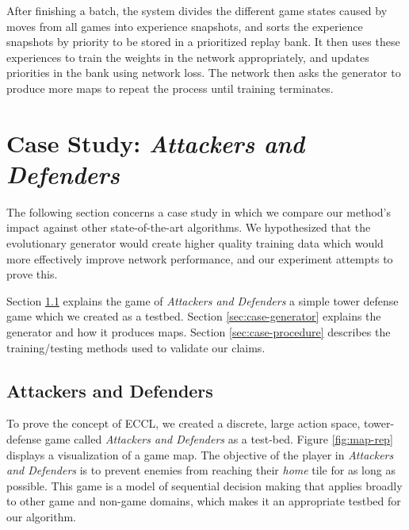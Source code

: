 \documentclass[letterpaper]{article} %
\begin{document}

After finishing a batch, the system divides the different game states caused by moves from all games into experience snapshots, and sorts the experience snapshots by priority to be stored in a prioritized replay bank. It then uses these experiences to train the weights in the network appropriately, and updates priorities in the bank using network loss. The network then asks the generator to produce more maps to repeat the process until training terminates.


\section{Case Study: \textit{Attackers and Defenders}}\label{sec:case}
The following section concerns a case study in which we compare our method's impact against other state-of-the-art algorithms. We hypothesized that the evolutionary generator would create higher quality training data which would more effectively improve network performance, and our experiment attempts to prove this.

Section \ref{sec:case-game} explains the game of \textit{Attackers and Defenders} a simple tower defense game which we created as a testbed. Section \ref{sec:case-generator} explains the generator and how it produces maps. Section \ref{sec:case-procedure} describes the training/testing methods used to validate our claims.

\subsection{Attackers and Defenders}\label{sec:case-game}
To prove the concept of ECCL, we created a discrete, large action space, tower-defense game called \textit{Attackers and Defenders} as a test-bed. Figure \ref{fig:map-rep} displays a visualization of a game map. The objective of the player in \textit{Attackers and Defenders} is to prevent enemies from reaching their \textit{home} tile for as long as possible. This game is a model of sequential decision making that applies broadly to other game and non-game domains, which makes it an appropriate testbed for our algorithm.
\end{document}
